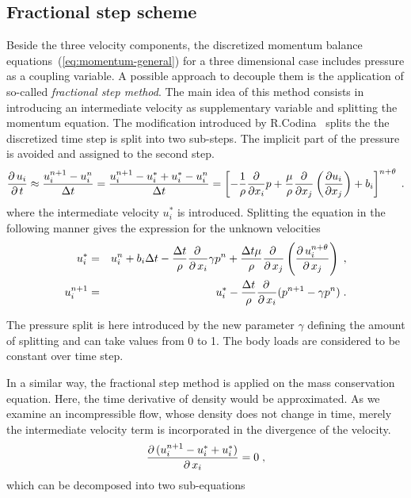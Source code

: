 \subsection{Fractional step scheme}
Beside the three velocity components, the discretized momentum balance equations~(\ref{eq:momentum-general}) for a three dimensional case includes pressure as a coupling variable. A possible approach to decouple them is the application of so-called \emph{fractional step method}. The main idea of this method consists in introducing an intermediate velocity as supplementary variable and splitting the momentum equation. The modification introduced by R.Codina~\cite{Codina01} splits the the discretized time step is split into two sub-steps. The implicit part of the pressure is avoided and assigned to the second step.
\begin{equation}
  \mbox{$\displaystyle\frac{\partial \,{u_i}}{\partial \,{t}}$} \approx \frac{u^{n+1}_i-u^n_i}{\Delta t}=\frac{u^{n+1}_i-u^*_i+u^*_i-u^n_i}{\Delta t}= \left[ - \frac{1}{\rho}\frac{\partial}{\partial x_i}p+\frac{\mu}{\rho}\frac{\partial}{\partial x_j}\left(\frac{\partial u_i}{\partial x_j}\right)+b_i\right]^{n+\theta}\;.
\end{equation}
where the intermediate velocity $u^*_i$ is introduced. Splitting the equation in the following manner gives the expression for the unknown velocities
\begin{eqnarray}\label{rce:uistar}
    u^*_i &=& u^n_i+b_i\Delta t - \frac{\Delta t}{\rho}\mbox{$\displaystyle\frac{\partial \,{}}{\partial \,{x_i}}$}\gamma p^n+\frac{\Delta t\mu}{\rho}\mbox{$\displaystyle\frac{\partial \,{}}{\partial \,{x_j}}$}\left(\mbox{$\displaystyle\frac{\partial \,{u^{n+\theta}_i}}{\partial \,{x_j}}$}\right)\;,\\
    u^{n+1}_i &=& u^*_i- \frac{\Delta t}{\rho}\mbox{$\displaystyle\frac{\partial \,{}}{\partial \,{x_i}}$}(p^{n+1}-\gamma p^n)\;. \label{eq:uin1}
\end{eqnarray}

The pressure split is here introduced by the new parameter $\gamma$ defining the amount of splitting and can take values from 0 to 1. The body loads are considered to be constant over time step.
\par
In a similar way, the fractional step method is applied on the mass conservation equation. Here, the time derivative of density would be approximated. As we examine an incompressible flow, whose density does not change in time, merely the intermediate velocity term is incorporated in the divergence of the velocity.
\begin{equation}
  \mbox{$\displaystyle\frac{\partial \,{(u^{n+1}_i-u^*_i+u^*_i)}}{\partial \,{x_i}}$} = 0 \;,
\end{equation}
which can be decomposed into two sub-equations

